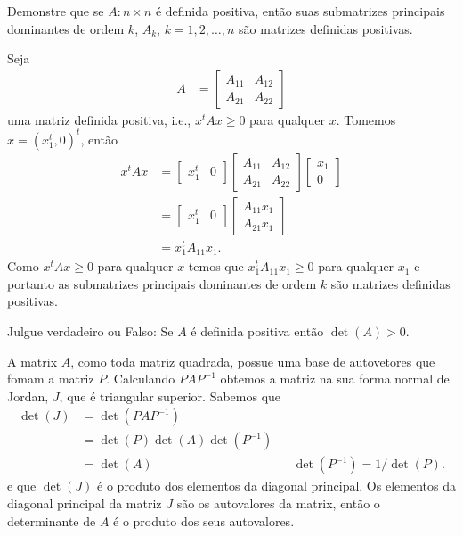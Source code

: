\documentclass[a4paper,12pt, leqno, answers]{exam}
\begin{document}
\begin{questions}
    \question Demonstre que se $A : n \times n$ \'{e} definida positiva, ent\~{a}o suas submatrizes principais dominantes de ordem $k$, $A_k$, $k = 1, 2, \ldots, n$ s\~{a}o matrizes definidas positivas.
    \begin{solution}
        Seja
        \begin{align*}
            A &= \begin{bmatrix}
                A_{11} & A_{12} \\
                A_{21} & A_{22}
            \end{bmatrix}
        \end{align*}
        uma matriz definida positiva, i.e., $x^t A x \geq 0$ para qualquer $x$. Tomemos $x = (x_1^t, 0)^t$, ent\~{a}o
        \begin{align*}
            x^t A x &= \begin{bmatrix}
                x_1^t & 0
            \end{bmatrix} \begin{bmatrix}
                A_{11} & A_{12} \\
                A_{21} & A_{22}
            \end{bmatrix} \begin{bmatrix}
                x_1 \\
                0
            \end{bmatrix} \\
            &= \begin{bmatrix}
                x_1^t & 0
            \end{bmatrix} \begin{bmatrix}
                A_{11} x_1 \\
                A_{21} x_1
            \end{bmatrix} \\
            &= x_1^t A_{11} x_1.
        \end{align*}
        Como $x^t A x \geq 0$ para qualquer $x$ temos que $x_1^t A_{11} x_1 \geq 0$ para qualquer $x_1$ e portanto as submatrizes principais dominantes de ordem $k$ s\~{a}o matrizes definidas positivas.
    \end{solution}

    \question Julgue verdadeiro ou Falso: Se $A$ \'{e} definida positiva ent\~{a}o $\det(A) > 0$.
    \begin{solution}
        A matrix $A$, como toda matriz quadrada, possue uma base de autovetores que fomam a matriz $P$. Calculando $P A P^{-1}$ obtemos a matriz na sua forma normal de Jordan, $J$, que \'{e} triangular superior. Sabemos que
        \begin{align*}
            \det(J) &= \det(P A P^{-1}) \\
            &= \det(P) \det(A) \det(P^{-1}) \\
            &= \det(A) && \det(P^{-1}) = 1 / \det(P).
        \end{align*}
        e que $\det(J)$ \'{e} o produto dos elementos da diagonal principal. Os elementos da diagonal principal da matriz $J$ s\~{a}o os autovalores da matrix, ent\~{a}o o determinante de $A$ \'{e} o produto dos seus autovalores.


\end{solution}
\end{questions}
\end{document}
